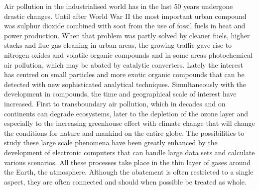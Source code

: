 Air pollution in the industrialised world has in the last 50 years undergone drastic changes. Until after World War II the most important urban compound was sulphur dioxide combined with soot from the use of fossil fuels in heat and power production. When that problem was partly solved by cleaner fuels, higher stacks and flue gas cleaning in urban areas, the growing traffic gave rise to nitrogen oxides and volatile organic compounds and in some areas photochemical air pollution, which may be abated by catalytic converters. Lately the interest has centred on small particles and more exotic organic compounds that can be detected with new sophisticated analytical techniques. Simultaneously with the development in compounds, the time and geographical scale of interest have increased. First to transboundary air pollution, which in decades and on continents can degrade ecosystems, later to the depletion of the ozone layer and especially to the increasing greenhouse effect with climate change that will change the conditions for nature and mankind on the entire globe. The possibilities to study these large scale phenomena have been greatly enhanced by the development of electronic computers that can handle large data sets and calculate various scenarios. All these processes take place in the thin layer of gases around the Earth, the atmosphere. Although the abatement is often restricted to a single aspect, they are often connected and should when possible be treated as whole.